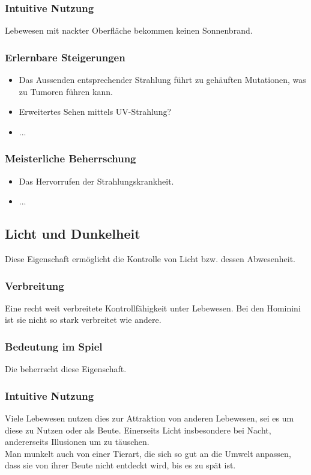 \subsubsection{Intuitive Nutzung}
Lebewesen mit nackter Oberfläche bekommen keinen Sonnenbrand.

\subsubsection{Erlernbare Steigerungen}
\begin{itemize}
	\item Das Aussenden entsprechender Strahlung führt zu gehäuften Mutationen, was zu Tumoren führen kann.
	\item Erweitertes Sehen mittels UV-Strahlung?
	\item ...
\end{itemize}

\subsubsection{Meisterliche Beherrschung} 
\begin{itemize}
	\item Das Hervorrufen der Strahlungskrankheit.
	\item ...
\end{itemize}

\subsection{Licht und Dunkelheit} \label{sec:lichtmagie}
Diese Eigenschaft ermöglicht die Kontrolle von Licht bzw. dessen Abwesenheit.

\subsubsection{Verbreitung}
Eine recht weit verbreitete Kontrollfähigkeit unter Lebewesen. Bei den Hominini ist sie nicht so stark verbreitet wie andere.

\subsubsection{Bedeutung im Spiel}
Die  beherrscht diese Eigenschaft. 


\subsubsection{Intuitive Nutzung}
Viele Lebewesen nutzen dies zur Attraktion von anderen Lebewesen, sei es um diese zu Nutzen oder als Beute. Einerseits Licht insbesondere bei Nacht, andererseits Illusionen um zu täuschen. \\
Man munkelt auch von einer Tierart, die sich so gut an die Umwelt anpassen, dass sie von ihrer Beute nicht entdeckt wird, bis es zu spät ist. 

